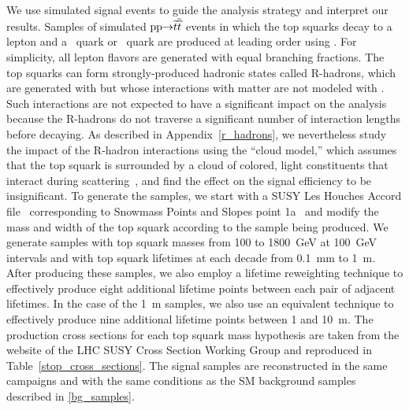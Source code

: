 We use simulated signal events to guide the analysis strategy and interpret our results. Samples of simulated $\mathrm{p}\mathrm{p} {\to} \widetilde{t} \overline{\widetilde{t}}$ events in which the top squarks decay to a lepton and a \cPqb\ quark or \cPqd\ quark are produced at leading order using . For simplicity, all lepton flavors are generated with equal branching fractions. The top squarks can form strongly-produced hadronic states called R-hadrons, which are generated with \PYTHIA but whose interactions with matter are not modeled with \GEANTfour. Such interactions are not expected to have a significant impact on the analysis because the R-hadrons do not traverse a significant number of interaction lengths before decaying. As described in Appendix~\ref{r_hadrons}, we nevertheless study the impact of the R-hadron interactions using the ``cloud model,'' which assumes that the top squark is surrounded by a cloud of colored, light constituents that interact during scattering~\cite{mackeprang_2006,mackeprang_2009}, and find the effect on the signal efficiency to be insignificant. To generate the samples, we start with a SUSY Les Houches Accord file~\cite{LesHouches} corresponding to Snowmass Points and Slopes point 1a~\cite{snowmass_points_slopes} and modify the mass and width of the top squark according to the sample being produced. We generate samples with top squark masses from \num{100} to \SI{1800}{\GeV} at \SI{100}{\GeV} intervals and with top squark lifetimes at each decade from \SI{0.1}{\mm} to \SI{1}{m}. After producing these samples, we also employ a lifetime reweighting technique to effectively produce eight additional lifetime points between each pair of adjacent lifetimes. In the case of the \SI{1}{m} samples, we also use an equivalent technique to effectively produce nine additional lifetime points between \num{1} and \SI{10}{\m}. The production cross sections for each top squark mass hypothesis are taken from the website of the LHC SUSY Cross Section Working Group and reproduced in Table~\ref{stop_cross_sections}. The signal samples are reconstructed in the same campaigns and with the same conditions as the SM background samples described in \ref{bg_samples}.



\pagebreak
